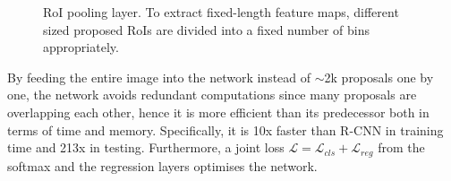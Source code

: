 \begin{figure}[!htb]
  \centering
  \caption{RoI pooling layer. To extract fixed-length feature maps, different sized proposed RoIs are divided into a fixed number of bins appropriately.}
  \label{ch2:fig4}
\end{figure}

By feeding the entire image into the network instead of $\sim$2k proposals one by one, the network avoids redundant computations since many proposals are overlapping each other, hence it is more efficient than its predecessor both in terms of time and memory. Specifically, it is 10x faster than R-CNN in training time and 213x in testing. Furthermore, a joint loss $\mathcal{L}=\mathcal{L}_{cls}+\mathcal{L}_{reg}$ from the softmax and the regression layers optimises the network.

